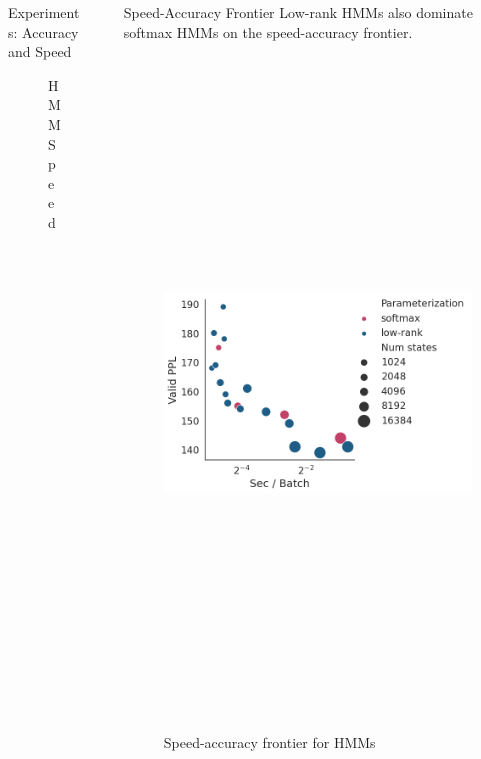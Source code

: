 \documentclass{beamer}
\newlength{\sepwid}
\newlength{\onecolwid}
\begin{document}
\begin{frame}
\begin{columns}[t]
\begin{column}{\onecolwid}
\begin{block}{Experiments: Accuracy and Speed}
\begin{figure}
\caption{HMM Speed}
\end{figure}
\end{block}


\end{column} %

\begin{column}{\sepwid}\end{column} %

\begin{column}{\onecolwid} %

\begin{block}{Speed-Accuracy Frontier}
Low-rank HMMs also dominate softmax HMMs on the speed-accuracy frontier.
\begin{figure}
\includegraphics[height=7in]{imgs/hmm/lhmm-speed-accuracy.png}
\caption{Speed-accuracy frontier for HMMs}
\end{figure}
\end{block}


\end{column}
\end{columns}
\end{frame}
\end{document}
